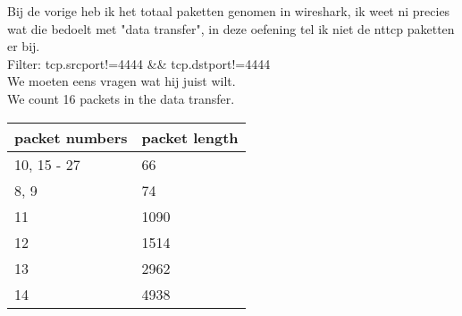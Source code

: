 Bij de vorige heb ik het totaal paketten genomen in wireshark, ik weet ni precies wat die bedoelt met "data transfer", in deze oefening tel ik niet de nttcp paketten er bij. \\
Filter: tcp.srcport!=4444 \&\& tcp.dstport!=4444 \\
We moeten eens vragen wat hij juist wilt. \\

We count 16 packets in the data transfer.


\begin{center}
\begin{tabular}{| l | l |}
    \hline
    packet numbers & packet length \\ \hline
    10, 15 - 27 & 66 \\ \hline
    8, 9 & 74 \\ \hline
    11 & 1090 \\ \hline
    12 & 1514 \\ \hline
    13 & 2962 \\ \hline
    14 & 4938 \\ \hline
\end{tabular}
\end{center}
